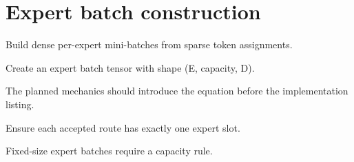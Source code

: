 \section{Expert batch construction}
\label{sec:ch06-expert-batch-construction}

Build dense per-expert mini-batches from sparse token assignments.



Create an expert batch tensor with shape (E, capacity, D).



The planned mechanics should introduce the equation before the implementation listing.





\begin{checkpointbox}
Ensure each accepted route has exactly one expert slot.
\end{checkpointbox}

Fixed-size expert batches require a capacity rule.
